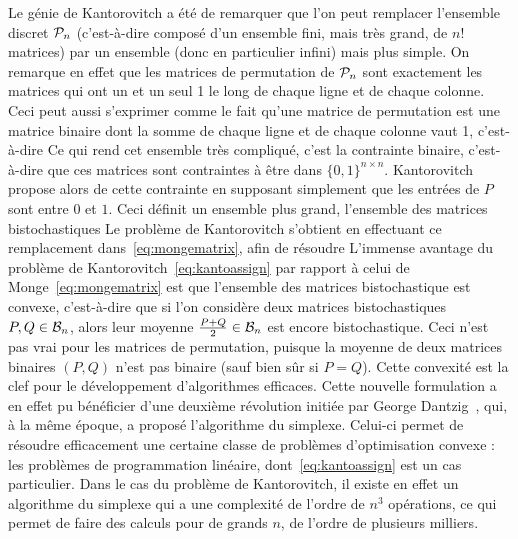 Le génie de Kantorovitch a été de remarquer que l'on peut remplacer l'ensemble discret $\mathcal{P}_n$ (c'est-à-dire composé d'un ensemble fini, mais très grand, de $n!$ matrices) par un ensemble  (donc en particulier infini) mais plus simple. On remarque en effet que les matrices de permutation de $\mathcal{P}_n$ sont exactement les matrices qui ont un et un seul 1 le long de chaque ligne et de chaque colonne. Ceci peut aussi s'exprimer comme le fait qu'une matrice de permutation est une matrice binaire dont la somme de chaque ligne et de chaque colonne vaut 1, c'est-à-dire
Ce qui rend cet ensemble très compliqué, c'est la contrainte binaire, c'est-à-dire que ces matrices sont contraintes à être dans $\{0,1\}^{n \times n}$. Kantorovitch propose alors de  cette contrainte en supposant simplement que les entrées de $P$ sont entre $0$ et $1$. Ceci définit un ensemble plus grand, l'ensemble des matrices bistochastiques 
Le problème de Kantorovitch s'obtient en effectuant ce remplacement dans~\eqref{eq:mongematrix}, afin de résoudre 
L'immense avantage du problème de Kantorovitch~\eqref{eq:kantoassign} par rapport à celui de Monge~\eqref{eq:mongematrix} est que l'ensemble des matrices bistochastique est convexe, c'est-à-dire que si l'on considère deux matrices bistochastiques $P,Q \in \mathcal{B}_n$, alors leur moyenne $\frac{P+Q}{2} \in \mathcal{B}_n$ est encore bistochastique. Ceci n'est pas vrai pour les matrices de permutation, puisque la moyenne de deux matrices binaires $(P,Q)$ n'est pas binaire (sauf bien sûr si $P=Q$). Cette convexité est la clef pour le développement d'algorithmes efficaces. 
%
Cette nouvelle formulation a en effet pu bénéficier d'une deuxième révolution initiée par George Dantzig~\cite{Dantzig51}, qui, à la même époque, a proposé l'algorithme du simplexe. Celui-ci permet de résoudre efficacement une certaine classe de problèmes d'optimisation convexe : les problèmes de programmation linéaire, dont~\eqref{eq:kantoassign} est un cas particulier. Dans le cas du problème de Kantorovitch, il existe en effet un algorithme du simplexe qui a une complexité de l'ordre de $n^3$ opérations, ce qui permet de faire des calculs pour de grands $n$, de l'ordre de plusieurs milliers. 


